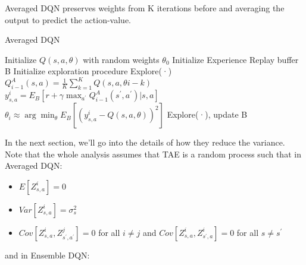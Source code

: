 Averaged DQN preserves weights from K iterations before and averaging the output to predict the action-value.
\begin{algorithm}[H]
  \caption{Averaged DQN}
  \begin{algorithmic}[1]
    \STATE Initialize \begin{math} Q(s,a,\theta)\end{math} with random weights \begin{math}\theta _0 \end{math}
    \STATE Initialize Experience Replay buffer B
    \STATE Initialize exploration procedure Explore(·)
        \STATE\begin{math}Q^A_{i-1}(s,a)=\frac{1}{K}\sum_{k=1}^{K}Q(s,a,\theta{i-k})\end{math}
        \STATE\begin{math}y^i_{s,a} = E_B[r+\gamma \max_{a^{'}} Q^A_{i-1}(s^{'},a^{'})|s,a]\end{math}
        \STATE\begin{math}\theta _i\approx \arg\min_{\theta}E_B[(y^i_{s,a}-Q(s,a,\theta))^2]\end{math}
        \STATE Explore(·), update B
    \ENDFOR
  \end{algorithmic}
\end{algorithm}
In the next section, we'll go into the details of how they reduce the variance. Note that the whole analysis assumes that TAE is a random process such that in Averaged DQN:
\begin{itemize}
    \item \begin{math}E[Z^i_{s,a}]=0\end{math}
    \item \begin{math}Var[Z^i_{s,a}]=\sigma ^2_s\end{math}
    \item \begin{math}Cov[Z^i_{s,a},Z^j_{s^{'},a^{'}}]=0\end{math} for all \begin{math}i\neq j\end{math}
and \begin{math}Cov[Z^i_{s,a},Z^i_{s^{'},a}]=0\end{math} for all \begin{math}s\neq s^'\end{math}
\end{itemize} 
and in Ensemble DQN: 
